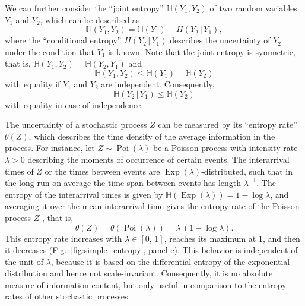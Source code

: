 \documentclass[smallextended]{svjour3}
\renewcommand{\H}{\mathbb{H}}
\newcommand{\Exp}{\operatorname{Exp}}
\newcommand{\Poi}{\operatorname{Poi}}
\newcommand{\ie}{that is}
\renewcommand{\emph}[1]{``#1''}
\begin{document}
We can further consider the \emph{joint entropy} $\H(Y_1,Y_2)$ of two random variables $Y_1$ and $Y_2$, which can be described as 
\begin{equation}
  \H(Y_1,Y_2) = \H(Y_1) + H(Y_2\,|\,Y_1),
\end{equation}
where the \emph{conditional entropy} $H(Y_2\,|\,Y_1)$ describes the uncertainty of $Y_2$ under the condition that $Y_1$ is known.
Note that the joint entropy is symmetric, \ie, $\H(Y_1,Y_2)=\H(Y_2,Y_1)$ and 
\begin{equation}
  \H(Y_1,Y_2)\leq \H(Y_1) + \H(Y_2)
\end{equation}
with equality if $Y_1$ and $Y_2$ are independent.
Consequently, 
\begin{equation}
  \H(Y_2\,|\,Y_1)\leq \H(Y_2)
\end{equation}
with equality in case of independence.

The uncertainty of a stochastic process $Z$ can be measured by its \emph{entropy rate} $\theta(Z)$, which describes the time density of the average information in the process.
For instance, let $Z\sim\Poi(\lambda)$ be a Poisson process with intensity rate $\lambda>0$ describing the moments of occurrence of certain events.
The interarrival times of $Z$ or the times between events are $\Exp(\lambda)$-distributed, such that in the long run on average the time span between events has length $\lambda^{-1}$.
The entropy of the interarrival times is given by $\H(\Exp(\lambda))=1-\log \lambda$, and averaging it over the mean interarrival time gives the entropy rate of the Poisson process $Z$ \citep[Sect.~3.3]{Gaspard1993PR}, \ie,
\begin{equation}
  \theta(Z) = \theta(\Poi(\lambda)) = \lambda\,(1-\log \lambda).
\end{equation}
This entropy rate increases with $\lambda\in[0,\,1]$, reaches its maximum at $1$, and then it decreases (Fig.~\ref{fig:simple_entropy}, panel c).
This behavior is independent of the unit of $\lambda$, because it is based on the differential entropy of the exponential distribution and hence not scale-invariant.
Consequently, it is no absolute measure of information content, but only useful in comparison to the entropy rates of other stochastic processes.
\end{document}
